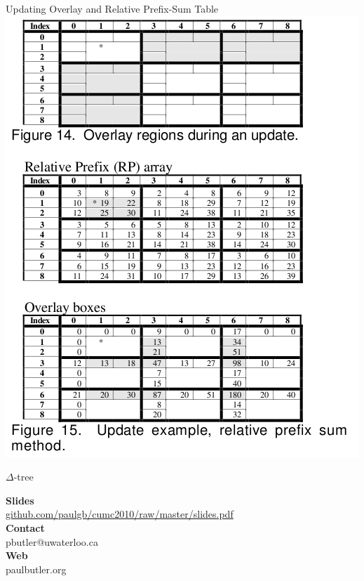 \documentclass{beamer}
\theoremstyle{definition}
\theoremstyle{definition}
\begin{document}
\begin{frame}{Updating Overlay and Relative Prefix-Sum Table}
\includegraphics[scale=0.35]{relprefix_update.png}
\cite{Geffner99}
\end{frame}

\begin{frame}{$\Delta$-tree}

\end{frame}

\begin{frame}
{}

\end{frame}


\begin{frame}
\textbf{Slides} \\
\url{github.com/paulgb/cumc2010/raw/master/slides.pdf} \\
\vspace{1.5em}
\textbf{Contact} \\
pbutler@uwaterloo.ca \\
\vspace{1.5em}
\textbf{Web} \\
paulbutler.org
\end{frame}
\end{document}
